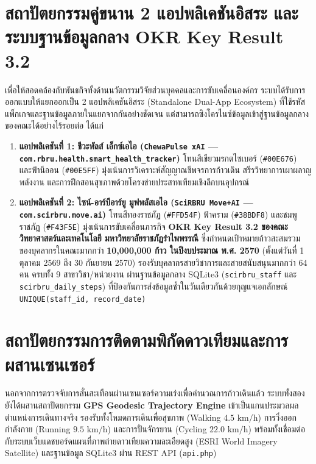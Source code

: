 \section{สถาปัตยกรรมคู่ขนาน 2 แอปพลิเคชันอิสระ และระบบฐานข้อมูลกลาง OKR Key Result 3.2}
เพื่อให้สอดคล้องกับพันธกิจทั้งด้านนวัตกรรมวิจัยส่วนบุคคลและการขับเคลื่อนองค์กร ระบบได้รับการออกแบบให้แยกออกเป็น 2 แอปพลิเคชันอิสระ (Standalone Dual-App Ecosystem) ที่ใช้รหัสแพ็กเกจและฐานข้อมูลภายในแยกจากกันอย่างชัดเจน แต่สามารถซิงโครไนซ์ข้อมูลเข้าสู่ฐานข้อมูลกลางของคณะได้อย่างไร้รอยต่อ ได้แก่
\begin{enumerate}
    \item \textbf{แอปพลิเคชันที่ 1: ชีวะพัลส์ เอ็กซ์เอไอ (\texttt{ChewaPulse xAI} --- \texttt{com.rbru.health.smart\_health\_tracker})} โทนสีเขียวมรกตไซเบอร์ (\texttt{\#00E676}) และฟ้านีออน (\texttt{\#00E5FF}) มุ่งเน้นการวิเคราะห์สัญญาณชีพจรการก้าวเดิน สรีรวิทยาการเผาผลาญพลังงาน และการฝึกสอนสุขภาพด้วยโครงข่ายประสาทเทียมเชิงลึกบนอุปกรณ์
    \item \textbf{แอปพลิเคชันที่ 2: ไซน์-อาร์บีอาร์ยู มูฟพลัสเอไอ (\texttt{SciRBRU Move+AI} --- \texttt{com.scirbru.move.ai})} โทนสีทองราชภัฏ (\texttt{\#FFD54F}) ฟ้าคราม (\texttt{\#38BDF8}) และชมพูราชภัฏ (\texttt{\#F43F5E}) มุ่งเน้นการขับเคลื่อนภารกิจ \textbf{OKR Key Result 3.2 ของคณะวิทยาศาสตร์และเทคโนโลยี มหาวิทยาลัยราชภัฏรำไพพรรณี} ซึ่งกำหนดเป้าหมายก้าวสะสมรวมของบุคลากรในคณะมากกว่า \textbf{10,000,000 ก้าว ในปีงบประมาณ พ.ศ. 2570} (ตั้งแต่วันที่ 1 ตุลาคม 2569 ถึง 30 กันยายน 2570) รองรับบุคลากรสายวิชาการและสายสนับสนุนมากกว่า 64 คน ครบทั้ง 9 สาขาวิชา/หน่วยงาน ผ่านฐานข้อมูลกลาง SQLite3 (\texttt{scirbru\_staff} และ \texttt{scirbru\_daily\_steps}) ที่ป้องกันการส่งข้อมูลซ้ำในวันเดียวกันด้วยกุญแจเอกลักษณ์ \texttt{UNIQUE(staff\_id, record\_date)}
\end{enumerate}

\section{สถาปัตยกรรมการติดตามพิกัดดาวเทียมและการผสานเซนเซอร์}
นอกจากการตรวจจับการสั่นสะเทือนผ่านเซนเซอร์ความเร่งเพื่อคำนวณการก้าวเดินแล้ว ระบบทั้งสองยังได้ผสานสถาปัตยกรรม \textbf{GPS Geodesic Trajectory Engine} เข้าเป็นแกนประมวลผลตำแหน่งการเดินทางจริง รองรับทั้งโหมดการเดินเพื่อสุขภาพ (Walking $4.5\text{ km/h}$) การวิ่งออกกำลังกาย (Running $9.5\text{ km/h}$) และการปั่นจักรยาน (Cycling $22.0\text{ km/h}$) พร้อมทั้งเชื่อมต่อกับระบบเว็บแดชบอร์ดแผนที่ภาพถ่ายดาวเทียมความละเอียดสูง (ESRI World Imagery Satellite) และฐานข้อมูล SQLite3 ผ่าน REST API (\texttt{api.php})


